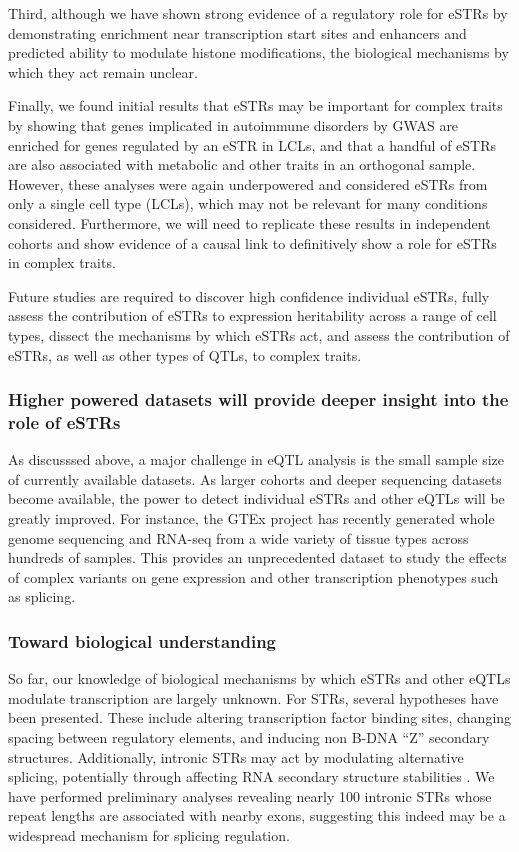 Third, although we have shown strong evidence of a regulatory role for eSTRs by demonstrating enrichment near transcription start sites and enhancers and predicted ability to modulate histone modifications, the biological mechanisms by which they act remain unclear.

Finally, we found initial results that eSTRs may be important for complex traits by showing that genes implicated in autoimmune disorders by GWAS are enriched for genes regulated by an eSTR in LCLs, and that a handful of eSTRs are also associated with metabolic and other traits in an orthogonal sample. However, these analyses were again underpowered and considered eSTRs from only a single cell type (LCLs), which may not be relevant for many conditions considered. Furthermore,  we will need to replicate these results in independent cohorts and show evidence of a causal link to definitively show a role for eSTRs in complex traits.

Future studies are required to discover high confidence individual eSTRs, fully assess the contribution of eSTRs to expression heritability across a range of cell types, dissect the mechanisms by which eSTRs act, and assess the contribution of eSTRs, as well as other types of QTLs, to complex traits.

\subsubsection{Higher powered datasets will provide deeper insight into the role of eSTRs}
As discusssed above, a major challenge in eQTL analysis is the small sample size of currently available datasets. As larger cohorts and deeper sequencing datasets become available, the power to detect individual eSTRs and other eQTLs will be greatly improved. For instance, the GTEx project \cite{ArdlieDelucaSegreEtAl2015} has recently generated whole genome sequencing and RNA-seq from a wide variety of tissue types across hundreds of samples. This provides an unprecedented dataset to study the effects of complex variants on gene expression and other transcription phenotypes such as splicing. 

\subsubsection{Toward biological understanding}
So far, our knowledge of biological mechanisms by which eSTRs and other eQTLs modulate transcription are largely unknown. For STRs, several hypotheses have been presented. These include altering transcription factor binding sites, changing spacing between regulatory elements, and inducing non B-DNA ``Z'' secondary structures. Additionally, intronic STRs may act by modulating alternative splicing, potentially through affecting RNA secondary structure stabilities \cite{HefferonGromanYurkEtAl2004}. We have performed preliminary analyses revealing nearly 100 intronic STRs whose repeat lengths are associated with nearby exons, suggesting this indeed may be a widespread mechanism for splicing regulation.


